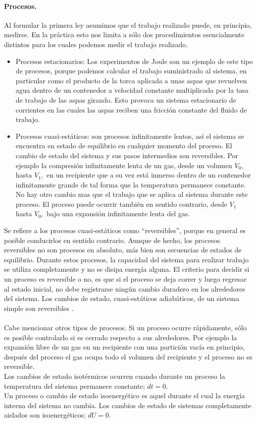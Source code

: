 \documentclass{article}
\theoremstyle{definition} \newtheorem{defi}{Definici\'on}
\theoremstyle{definition} \newtheorem{teo}{Teorema}
\theoremstyle{definition} \newtheorem{cor}{Corolario}
\begin{document}
\paragraph{Procesos.}
Al formular la primera ley asumimos que el trabajo realizado puede, en principio, medirse. En la pr\'actica esto nos limita a s\'olo dos procedimientos esencialmente distintos para los cuales podemos medir el trabajo realizado.
\begin{itemize}
\item Procesos estacionarios: Los experimentos de Joule son un ejemplo de este tipo de procesos, porque podemos calcular el trabajo suministrado al sistema, en particular como el producto de la torca aplicada a unas aspas que revuelven agua dentro de un contenedor a velocidad constante multiplicada por la tasa de trabajo de las aspas girando. Esto provoca un sistema estacionario de corrientes en las cuales las aspas reciben una fricci\'on constante del fluido de trabajo.
\item Procesos cuasi-est\'aticos: son procesos infinitamente lentos, as\'i el sistema se encuentra en estado de equilibrio en cualquier momento del proceso. El cambio de estado del sistema y sus pasos intermedios son reversibles. Por ejemplo la compresi\'on infinitamente lenta de un gas, desde un volumen $V_0,$ hasta $V_1,$ en un recipiente que a su vez est\'a inmerso dentro de un contenedor infinitamente grande de tal forma que la temperatura permanece constante. No hay otro cambio mas que el trabajo que se aplica al sistema durante este proceso. El proceso puede ocurrir tambi\'en en sentido contrario, desde $V_1$ hasta $V_0,$ bajo una expansi\'on infinitamente lenta del gas.
\end{itemize}
Se refiere a los procesos cuasi-est\'aticos como ``reversibles'', porque en general es posible conducirlos en sentido contrario. Aunque de hecho, los procesos reversibles no son procesos en absoluto, m\'as bien son secuencias de estados de equilibrio. Durante estos procesos, la capacidad del sistema para realizar trabajo se utiliza completamente y no se disipa energ\'ia alguna. El criterio para decidir si un proceso es reversible o no, es que si el proceso se deja correr y luego regresar al estado inicial, no debe registrarse ning\'un cambio duradero en los alrededores del sistema. Los cambios de estado, cuasi-est\'aticos adiab\'aticos, de un sistema simple son reversibles \cite{CC}.
\paragraph{}
Cabe mencionar otros tipos de procesos. Si un proceso ocurre r\'apidamente, s\'olo es posible controlarlo si es cerrado respecto a sus alrededores. Por ejemplo la expansi\'on libre de un gas en un recipiente con una partici\'on vac\'ia en principio, despu\'es del proceso el gas ocupa todo el volumen del recipiente y el proceso no es reversible.\\
Los cambios de estado isot\'ermicos ocurren cuando durante un proceso la temperatura del sistema permanece constante; $dt=0.$\\
Un proceso o cambio de estado isoenerg\'etico es aquel durante el cual la energ\'ia interna del sistema no cambia. Los cambios de estado de sistemas completamente aislados son isoenerg\'eticos; $dU=0.$
\end{document}
